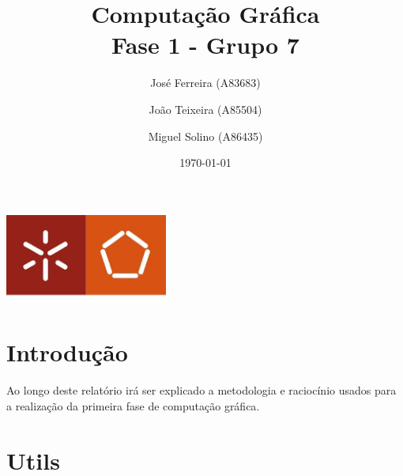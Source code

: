 \documentclass[a4paper]{report}
\begin{document}
\title{Computação Gráfica\\
\large Fase 1 - Grupo 7}
\author{José Ferreira (A83683) \and João Teixeira (A85504) \and Miguel Solino (A86435)}
\date{\today}

\begin{center}
    \begin{minipage}{0.75\linewidth}
        \centering
        \includegraphics[width=0.4\textwidth]{images/eng.jpeg}\par\vspace{1cm}
        \vspace{1.5cm}
        \href{https://www.uminho.pt/PT}
        {\color{black}{\scshape\LARGE Universidade do Minho}} \par
        \vspace{1cm}
        \href{https://www.di.uminho.pt/}
        {\color{black}{\scshape\Large Departamento de Informática}} \par
        \vspace{1.5cm}
        \maketitle
    \end{minipage}
\end{center}

\tableofcontents

\chapter{Introdução}
Ao longo deste relatório irá ser explicado a metodologia e raciocínio usados
para a realização da primeira fase de computação gráfica.

\chapter{Utils}
\end{document}
